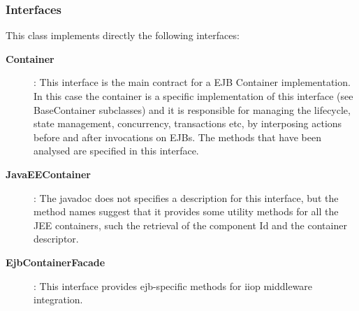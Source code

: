 \documentclass[11pt, a4paper,titlepage]{article}
\begin{document}
	\subsubsection{Interfaces}
	This class implements directly the following interfaces:
	 \begin{description}
	 	\item[\textbf{Container}]: This interface is the main contract for a EJB Container implementation. In this case the container is a specific implementation of this interface (see BaseContainer subclasses) and it is responsible for managing the lifecycle, state management, concurrency, transactions etc, by interposing actions before and after invocations on EJBs.
	 	 The methods that have been analysed are specified in this interface.
	 	 \item[\textbf{JavaEEContainer}]: The javadoc does not specifies a description for this interface, but the method names suggest that it provides some utility methods for all the JEE containers, such the retrieval of the component Id and the container descriptor.
	 	 \item[\textbf{EjbContainerFacade}]: This interface provides ejb-specific methods for iiop middleware integration.
	 \end{description}
\end{document}
